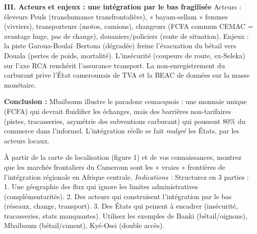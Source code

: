 \documentclass[11pt]{article}
\begin{document}
\begin{exoresolu}
\textbf{III. Acteurs et enjeux : une intégration par le bas fragilisée}
Acteurs : éleveurs Peuls (transhumance transfrontalière), « bayam-sellam » femmes (vivriers), transporteurs (motos, camions), changeurs (FCFA commun CEMAC = avantage huge, pas de change), douaniers/policiers (rente de situation). Enjeux : la piste Garoua-Boulaï–Bertoua (dégradée) freine l'évacuation du bétail vers Douala (pertes de poids, mortalité). L'insécurité (coupeurs de route, ex-Seleka) sur l'axe RCA renchérit l'assurance transport. La non-enregistrement du carburant prive l'État camerounais de TVA et la BEAC de données sur la masse monétaire.

\textbf{Conclusion :} Mbaïboum illustre le paradoxe cemacquois : une monnaie unique (FCFA) qui devrait fluidifier les échanges, mais des barrières non-tarifaires (pistes, tracasseries, asymétrie des subventions carburant) qui poussent 80\% du commerce dans l'informel. L'intégration réelle se fait \emph{malgré} les États, par les acteurs locaux.
\end{exoresolu}

\begin{exercice}
À partir de la carte de localisation (figure 1) et de vos connaissances, montrez que les marchés frontaliers du Cameroun sont les « vraies » frontières de l'intégration régionale en Afrique centrale.
\textit{Indications :} Structurez en 3 parties : 1. Une géographie des flux qui ignore les limites administratives (complémentarités). 2. Des acteurs qui construisent l'intégration par le bas (réseaux, change, transport). 3. Des États qui peinent à encadrer (insécurité, tracasseries, stats manquantes). Utilisez les exemples de Banki (bétail/oignons), Mbaïboum (bétail/ciment), Kyé-Ossi (double accès).
\end{exercice}
\end{document}
